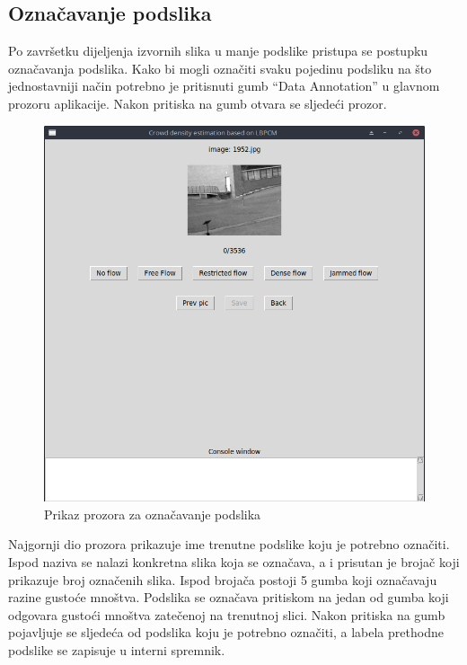 \documentclass[times, utf8, zavrsni]{fer}
\begin{document}
\subsection{Označavanje podslika}

Po završetku dijeljenja izvornih slika u manje podslike pristupa se postupku
označavanja podslika. Kako bi mogli označiti svaku pojedinu podsliku na
što jednostavniji način potrebno je pritisnuti gumb \enquote{Data Annotation} 
u glavnom prozoru aplikacije. Nakon pritiska na gumb otvara se sljedeći prozor.

\begin{figure}[ht]
\centering
\includegraphics[scale=0.4]{img/dataannotation.png}
\caption{Prikaz prozora za označavanje podslika}
\end{figure}

Najgornji dio prozora prikazuje ime trenutne podslike koju je potrebno označiti.
Ispod naziva se nalazi konkretna slika koja se označava, a i prisutan je brojač
koji prikazuje broj označenih slika. Ispod brojača postoji 5 gumba koji
označavaju razine gustoće mnoštva. Podslika se označava pritiskom na jedan
od gumba koji odgovara gustoći mnoštva zatečenoj na trenutnoj slici. Nakon pritiska
na gumb pojavljuje se sljedeća od podslika koju je potrebno označiti, a labela
prethodne podslike se zapisuje u interni spremnik. 
\end{document}
